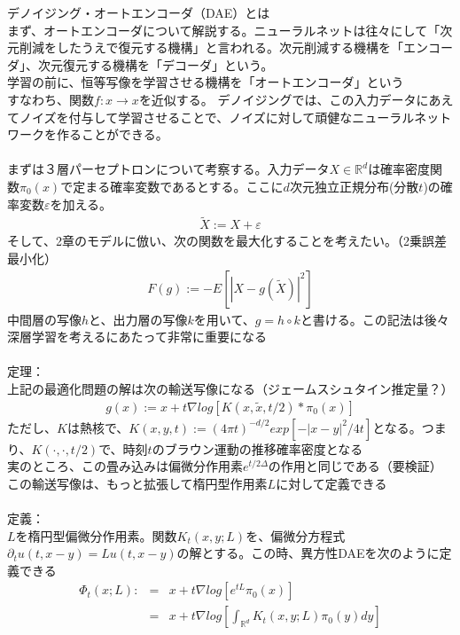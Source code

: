 \documentclass{jsarticle}
\begin{document}
デノイジング・オートエンコーダ（DAE）とは\\
まず、オートエンコーダについて解説する。ニューラルネットは往々にして「次元削減をしたうえで復元する機構」と言われる。次元削減する機構を「エンコーダ」、次元復元する機構を「デコーダ」という。\\
学習の前に、恒等写像を学習させる機構を「オートエンコーダ」という\\
すなわち、関数$f:x\rightarrow x$を近似する。
デノイジングでは、この入力データにあえてノイズを付与して学習させることで、ノイズに対して頑健なニューラルネットワークを作ることができる。\\
　\\
まずは３層パーセプトロンについて考察する。入力データ$X\in\mathbb{R}^d$は確率密度関数$\pi_0(x)$で定まる確率変数であるとする。ここに$d$次元独立正規分布(分散$t$)の確率変数$\varepsilon$を加える。
\begin{eqnarray}
\tilde{X}:=X+\varepsilon
\end{eqnarray}
そして、2章のモデルに倣い、次の関数を最大化することを考えたい。（2乗誤差最小化）
\begin{eqnarray}
F(g):=-E[|X-g(\tilde{X})|^2]
\end{eqnarray}
中間層の写像$h$と、出力層の写像$k$を用いて、$g=h\circ k$と書ける。この記法は後々深層学習を考えるにあたって非常に重要になる\\
　\\
定理：\\
上記の最適化問題の解は次の輸送写像になる（ジェームスシュタイン推定量？）
\begin{eqnarray}
g(x):=x+t\nabla log[K(x,\tilde{x},t/2)*\pi_0(x)]
\end{eqnarray}
ただし、$K$は熱核で、$K(x,y,t):=(4\pi t)^{-d/2}exp[-|x-y|^2/4t]$となる。つまり、$K(\cdot,\cdot,t/2)$で、時刻$t$のブラウン運動の推移確率密度となる\\
実のところ、この畳み込みは偏微分作用素$e^{t/2\Delta}$の作用と同じである（要検証）\\
この輸送写像は、もっと拡張して楕円型作用素$L$に対して定義できる\\
　\\
定義：\\
$L$を楕円型偏微分作用素。関数$K_t(x,y;L)$を、偏微分方程式$\partial_t u(t,x-y)=Lu(t,x-y)$の解とする。この時、異方性DAEを次のように定義できる
\begin{eqnarray}
\Phi_t(x;L):&=&x+t\nabla log[e^{tL}\pi_0(x)]\nonumber\\
&=&x+t\nabla log[\int_{\mathbb{R}^d}K_t(x,y;L)\pi_0(y)dy]
\end{eqnarray}
\end{document}
